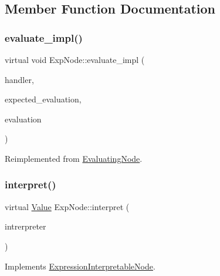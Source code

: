 \subsection{Member Function Documentation}
\mbox{\label{classExpNode_a58c05ac75051f109512ce8fa5ceb68c7}} 
\subsubsection{\texorpdfstring{evaluate\+\_\+impl()}{evaluate\_impl()}}
{\footnotesize\ttfamily virtual void Exp\+Node\+::evaluate\+\_\+impl (\begin{DoxyParamCaption}\item[{\hyperlink{classSystemHandler}{System\+Handler} $\ast$}]{handler,  }\item[{\hyperlink{statics_8h_a6664c451ca7787483a7981cc1de68dbb}{E\+V\+A\+L\+U\+A\+T\+I\+O\+N\+\_\+\+T\+Y\+PE}}]{expected\+\_\+evaluation,  }\item[{struct \hyperlink{structEvaluation}{Evaluation} $\ast$}]{evaluation }\end{DoxyParamCaption})\hspace{0.3cm}{\ttfamily [virtual]}}



Reimplemented from \hyperlink{classEvaluatingNode_abb86fa7334a5871f959b0633db3b5215}{Evaluating\+Node}.

\mbox{\label{classExpNode_aedff3b19b9e36a77e4558a168b81debf}} 
\subsubsection{\texorpdfstring{interpret()}{interpret()}}
{\footnotesize\ttfamily virtual \hyperlink{classValue}{Value} Exp\+Node\+::interpret (\begin{DoxyParamCaption}\item[{\hyperlink{classInterpreter}{Interpreter} $\ast$}]{intrerpreter }\end{DoxyParamCaption})\hspace{0.3cm}{\ttfamily [virtual]}}



Implements \hyperlink{classExpressionInterpretableNode_a43650f046c48fc539f77a207e3c9181e}{Expression\+Interpretable\+Node}.

